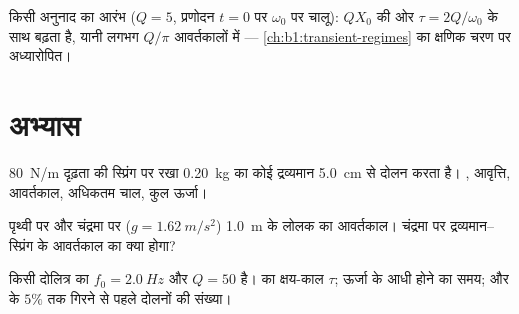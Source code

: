 \begin{omfigure}

{\small किसी अनुनाद का आरंभ ($Q = 5$, प्रणोदन $t = 0$ पर $\omega_0$ पर चालू):
 $QX_0$ की ओर 
$\tau = 2Q/\omega_0$ के साथ बढ़ता है, यानी लगभग $Q/\pi$ आवर्तकालों में ---
\cref{ch:b1:transient-regimes} का क्षणिक चरण  पर अध्यारोपित।}
\end{omfigure}

\section{अभ्यास}

\begin{exercise}[$\star$]\label{exo:b1:oscillators-resonance:1}
\qty{80}{N/m} दृढ़ता की स्प्रिंग पर रखा \qty{0.20}{kg} का कोई द्रव्यमान
\qty{5.0}{cm}  से दोलन करता है। , आवृत्ति, आवर्तकाल,
अधिकतम चाल, कुल ऊर्जा।
\end{exercise}

\begin{exercise}[$\star$]\label{exo:b1:oscillators-resonance:2}
पृथ्वी पर और चंद्रमा पर ($g = \qty{1.62}{m/s^2}$) \qty{1.0}{m} के लोलक का
आवर्तकाल। चंद्रमा पर द्रव्यमान--स्प्रिंग के आवर्तकाल का क्या होगा?
\end{exercise}

\begin{exercise}[$\star$]\label{exo:b1:oscillators-resonance:3}
किसी दोलित्र का $f_0 = \qty{2.0}{Hz}$ और $Q = 50$ है।  का क्षय-काल
$\tau$; ऊर्जा के आधी होने का समय; और  के $5\%$ तक गिरने से पहले दोलनों
की संख्या।
\end{exercise}

